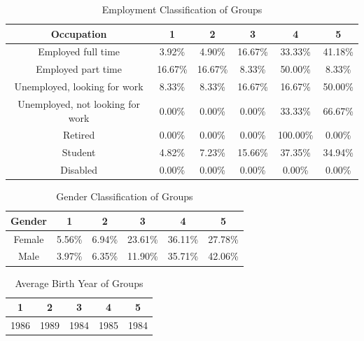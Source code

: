 \begin{table}[h!]
  \centering
  \caption{Employment Classification of Groups}
  \label{tab:emp_stak}
  \begin{tabular}{cccccc}
    \toprule
     Occupation&1&2&3&4&5\\
    \midrule
Employed full time	&3.92\%	&4.90\%	&16.67\%	&33.33\%	&41.18\%\\
Employed part time	&16.67\%	&16.67\%	&8.33\%	&50.00\%	&8.33\%\\
Unemployed, looking for work	&8.33\%	&8.33\%	&16.67\%	&16.67\%	&50.00\%\\
Unemployed, not looking for work	&0.00\%	&0.00\%	&0.00\%	&33.33\%	&66.67\%\\
Retired	&0.00\%	&0.00\%	&0.00\%	&100.00\%&	0.00\%\\
Student	&4.82\%	&7.23\%	&15.66\%	&37.35\%	&34.94\%\\
Disabled	&0.00\%	&0.00\%	&0.00\%	&0.00\%	&0.00\%\\
    \bottomrule
  \end{tabular}
\end{table}



\begin{table}[h!]
  \centering
  \caption{Gender Classification of Groups}
  \label{tab:gender_stak}
  \begin{tabular}{cccccc}
    \toprule
     Gender&1&2&3&4&5 \\
     \midrule
Female&5.56\%&6.94\%&23.61\%&36.11\%&27.78\% \\
Male&3.97\%&6.35\%&11.90\%&35.71\%&42.06\%\\
    \bottomrule
  \end{tabular}
\end{table}



\begin{table}[h!]
  \centering
  \caption{Average Birth Year of Groups}
  \label{tab:year_stak}
  \begin{tabular}{ccccc}
    \toprule
     1&2&3&4&5\\
    \midrule
	1986& 1989& 1984& 1985& 1984\\
    \bottomrule
  \end{tabular}
\end{table}


